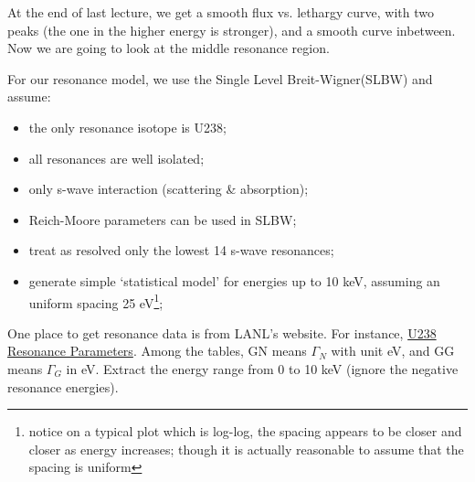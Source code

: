\documentclass{school-22.211-notes}
\date{February 15, 2012}
\begin{document}
\maketitle

At the end of last lecture, we get a smooth flux vs. lethargy curve, with two peaks (the one in the higher energy is stronger), and a smooth curve inbetween. Now we are going to look at the middle resonance region. 

For our resonance model, we use the Single Level Breit-Wigner(SLBW) and assume:
\begin{itemize}
  \item the only resonance isotope is U238;
  \item all resonances are well isolated;
  \item only s-wave interaction (scattering \& absorption);
  \item Reich-Moore parameters can be used in SLBW;
  \item treat as resolved only the lowest 14 s-wave resonances;
  \item generate simple `statistical model' for energies up to 10 keV, assuming an uniform spacing 25 eV\footnote{notice on a typical plot which is log-log, the spacing appears to be closer and closer as energy increases; though it is actually reasonable to assume that the spacing is uniform};
\end{itemize}

One place to get resonance data is from LANL's website. For instance, \href{http://t2.lanl.gov/cgi-bin/endf?2,151,/inet/WWW/data/data/ENDFB-VII-neutron/U/238}{U238 Resonance Parameters}. Among the tables, GN means $\Gamma_N$ with unit eV, and GG means $\Gamma_G$ in eV. Extract the energy range from 0 to 10 keV (ignore the negative resonance energies). 
\end{document}
